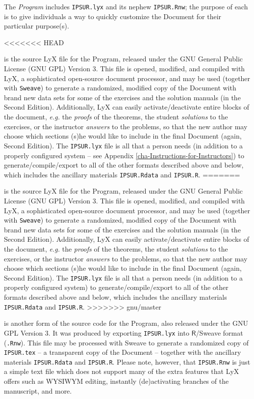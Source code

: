 The \emph{Program} includes \texttt{IPSUR.lyx} and its nephew \texttt{IPSUR.Rnw}; the purpose of each is to give individuals a way to quickly customize the Document for their particular purpose(s).
\begin{description}
<<<<<<< HEAD
\item[IPSUR.lyx] is the source LyX file for the Program, released under the GNU General Public License (GNU GPL) Version 3. This file is opened, modified, and compiled with LyX, a sophisticated open-source document processor, and may be used (together with \texttt{Sweave}) to generate a randomized, modified copy of the Document with brand new data sets for some of the exercises and the solution manuals (in the Second Edition). Additionally, LyX can easily activate/deactivate entire blocks of the document, \emph{e.g.} the \emph{proofs} of the theorems, the student \emph{solutions} to the exercises, or the instructor \emph{answers} to the problems, so that the new author may choose which sections (s)he would like to include in the final Document (again, Second Edition). The \texttt{IPSUR.lyx} file is all that a person needs (in addition to a properly configured system -- see Appendix \ref{cha-Instructions-for-Instructors}) to generate/compile/export to all of the other formats described above and below, which includes the ancillary materials \texttt{IPSUR.Rdata} and \texttt{IPSUR.R}.
=======
\item[IPSUR.lyx] is the source LyX file for the Program, released under the GNU General Public License (GNU GPL) Version 3. This file is opened, modified, and compiled with LyX, a sophisticated open-source document processor, and may be used (together with \texttt{Sweave}) to generate a randomized, modified copy of the Document with brand new data sets for some of the exercises and the solution manuals (in the Second Edition). Additionally, LyX can easily activate/deactivate entire blocks of the document, \emph{e.g.} the \emph{proofs} of the theorems, the student \emph{solutions} to the exercises, or the instructor \emph{answers} to the problems, so that the new author may choose which sections (s)he would like to include in the final Document (again, Second Edition). The \texttt{IPSUR.lyx} file is all that a person needs (in addition to a properly configured system) to generate/compile/export to all of the other formats described above and below, which includes the ancillary materials \texttt{IPSUR.Rdata} and \texttt{IPSUR.R}.
>>>>>>> gnu/master
\item[IPSUR.Rnw] is another form of the source code for the Program, also released under the GNU GPL Version 3. It was produced by exporting \texttt{IPSUR.lyx} into \(\mathsf{R}\)/Sweave format (\texttt{.Rnw}). This file may be processed with Sweave to generate a randomized copy of \texttt{IPSUR.tex} -- a transparent copy of the Document -- together with the ancillary materials \texttt{IPSUR.Rdata} and \texttt{IPSUR.R}. Please note, however, that \texttt{IPSUR.Rnw} is just a simple text file which does not support many of the extra features that LyX offers such as WYSIWYM editing, instantly (de)activating branches of the manuscript, and more.
\end{description}

